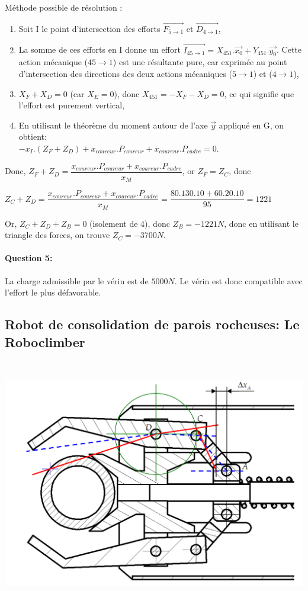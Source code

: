 Méthode possible de résolution :
\begin{enumerate}
 \item Soit I le point d'intersection des efforts $\overrightarrow{F_{5\rightarrow 1}}$ et $\overrightarrow{D_{4\rightarrow 1}}$,
 \item La somme de ces efforts en I donne un effort $\overrightarrow{I_{45\rightarrow 1}}=X_{451}.\overrightarrow{x_0}+Y_{451}.\overrightarrow{y_0}$. Cette action mécanique ($45\rightarrow 1$) est une résultante pure, car exprimée au point d'intersection des directions des deux actions mécaniques ($5\rightarrow 1$) et ($4\rightarrow 1$),
 \item $X_F+X_D=0$ (car $X_E=0$), donc $X_{451}=-X_F-X_D=0$, ce qui signifie que l'effort est purement vertical,
 \item En utilisant le théorème du moment autour de l'axe $\overrightarrow{y}$ appliqué en G, on obtient:\\
$-x_I.(Z_F+Z_D)+x_{coureur}.P_{coureur}+x_{coureur}.P_{cadre}=0$.
\end{enumerate}

Donc, $Z_F+Z_D=\dfrac{x_{coureur}.P_{coureur}+x_{coureur}.P_{cadre}}{x_M}$, or $Z_F=Z_C$, donc

$Z_C+Z_D=\dfrac{x_{coureur}.P_{coureur}+x_{coureur}.P_{cadre}}{x_M}=\dfrac{80.130.10+60.20.10}{95}=1221$

Or, $Z_C+Z_D+Z_B=0$ (isolement de 4), donc $Z_B=-1221N$, donc en utilisant le triangle des forces, on trouve $Z_C=-3700N$.


\paragraph{Question 5:}

La charge admissible par le vérin est de $5000N$. Le vérin est donc compatible avec l'effort le plus défavorable.

\newpage

\subsection{Robot de consolidation de parois rocheuses: Le \og Roboclimber \fg}

~\

\begin{center}
 \includegraphics[width=0.8\linewidth]{img/climb1_cor}
\end{center}
 

